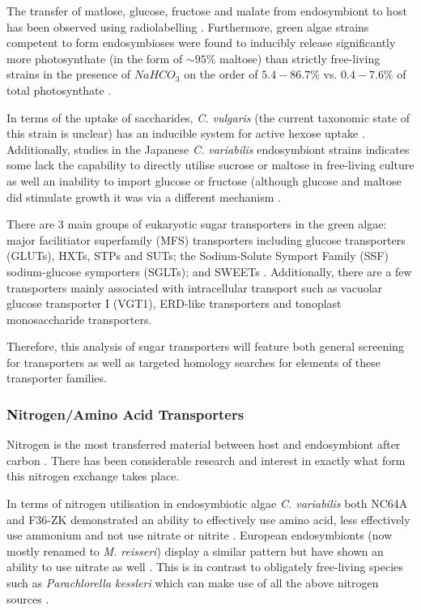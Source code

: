 The transfer of matlose, glucose, fructose and malate from endosymbiont
to host has been observed using radiolabelling 
\citep{Brown1974}.  Furthermore, green algae strains competent to
form endosymbioses were found to inducibly release significantly
more photosynthate (in the form of \(\sim 95\%\) maltose) than strictly free-living strains
in the presence of \(NaHCO_3\) on the order of \(5.4-86.7\%\) vs. \(0.4-7.6\%\)
of total photosynthate \citep{Muscatine1967a}.


In terms of the uptake of saccharides, \textit{C. vulgaris} (the current
taxonomic state of this strain is unclear) has an inducible system for active hexose uptake \citep{Tanner1974}.
Additionally, studies in the Japanese \textit{C. variabilis} endosymbiont strains
indicates some lack the capability to directly utilise sucrose or maltose in free-living culture \citep{Kamako2005}
as well an inability to import glucose or fructose \citep{Kato2008a} (although glucose and maltose
did stimulate growth \citep{Kamako2005} it was via a different mechanism \citep{Kato2009}.



There are 3 main groups of eukaryotic sugar transporters in the green algae: 
major facilitiator superfamily (MFS) transporters including glucose
transporters (GLUTs), HXTs, STPs and SUTs; the Sodium-Solute Symport Family (SSF) sodium-glucose symporters (SGLTs); 
and SWEETs \citep{Chen2010a,Chen2015}.
Additionally, there are a few transporters mainly associated with intracellular transport such as 
vacuolar glucose transporter I (VGT1), ERD-like transporters and tonoplast monosaccharide transporters.

Therefore, this analysis of sugar transporters will feature both general screening
for transporters as well as targeted homology searches for elements of these
transporter families.



\subsubsection{Nitrogen/Amino Acid Transporters}

Nitrogen is the most transferred material between host and endosymbiont
after carbon \citep{Kato2009}.  There has been considerable research and interest
in exactly what form this nitrogen exchange takes place.


In terms of nitrogen utilisation in endosymbiotic algae 
\textit{C. variabilis} both NC64A and F36-ZK demonstrated an ability
to effectively use amino acid, less effectively use ammonium and not
use nitrate or nitrite \citep{Kamako2005,Kato2009}.
European endosymbionts (now mostly renamed to \textit{M. reisseri}) display
a similar pattern but have 
shown an ability to use nitrate as well \citep{Kessler1990}.
This is in contrast to obligately free-living species such as \textit{Parachlorella
kessleri} which can make use of all the above nitrogen sources \citep{Kato2009}.


